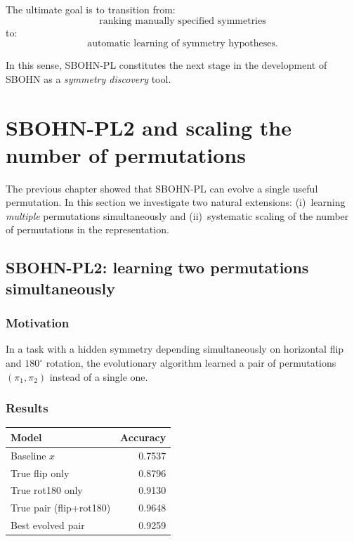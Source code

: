\documentclass[11pt,a4paper]{report}
\begin{document}
The ultimate goal is to transition from:
\[
\text{ranking manually specified symmetries}
\]
to:
\[
\text{automatic learning of symmetry hypotheses}.
\]

In this sense, SBOHN-PL constitutes the next stage in the development of SBOHN as a \emph{symmetry discovery} tool.



\section{SBOHN-PL2 and scaling the number of permutations}\label{sec:sbohn_pl2_k}

The previous chapter showed that SBOHN-PL can evolve a single useful permutation. In this section we investigate two natural extensions: (i)~learning \emph{multiple} permutations simultaneously and (ii)~systematic scaling of the number of permutations in the representation.

\subsection{SBOHN-PL2: learning two permutations simultaneously}

\subsubsection{Motivation}

In a task with a hidden symmetry depending simultaneously on horizontal flip and $180^\circ$ rotation, the evolutionary algorithm learned a pair of permutations $(\pi_1,\pi_2)$ instead of a single one.

\subsubsection{Results}

\begin{center}
\begin{tabular}{lr}
\toprule
Model & Accuracy \\
\midrule
Baseline $x$ & 0.7537 \\
True flip only & 0.8796 \\
True rot180 only & 0.9130 \\
True pair (flip+rot180) & 0.9648 \\
Best evolved pair & 0.9259 \\
\bottomrule
\end{tabular}
\end{center}
\end{document}
